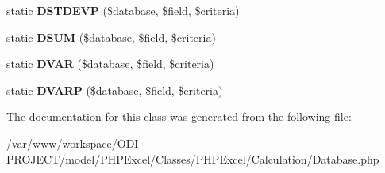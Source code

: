 \begin{DoxyCompactItemize}
\item 
static {\bfseries D\+S\+T\+D\+E\+V\+P} (\$database, \$field, \$criteria)\label{class_p_h_p_excel___calculation___database_aeafa2a3ca6acb5c7d8c42b34432d6aa0}

\item 
static {\bfseries D\+S\+U\+M} (\$database, \$field, \$criteria)\label{class_p_h_p_excel___calculation___database_a3565d8ca9ba9b9fe51f3bf15339481fc}

\item 
static {\bfseries D\+V\+A\+R} (\$database, \$field, \$criteria)\label{class_p_h_p_excel___calculation___database_adb7acc73cd12f63ce39451f06be03661}

\item 
static {\bfseries D\+V\+A\+R\+P} (\$database, \$field, \$criteria)\label{class_p_h_p_excel___calculation___database_a689428fb3726c5f0233dfc016cf7bc3e}

\end{DoxyCompactItemize}


The documentation for this class was generated from the following file\+:\begin{DoxyCompactItemize}
\item 
/var/www/workspace/\+O\+D\+I-\/\+P\+R\+O\+J\+E\+C\+T/model/\+P\+H\+P\+Excel/\+Classes/\+P\+H\+P\+Excel/\+Calculation/Database.\+php\end{DoxyCompactItemize}
